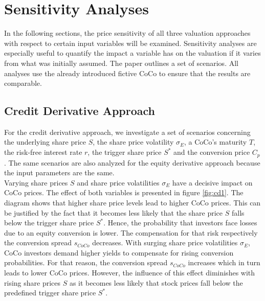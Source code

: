 \chapter{Sensitivity Analyses}
In the following sections, the price sensitivity of all three valuation approaches with respect to certain input variables will be examined. Sensitivity analyses are especially useful to quantify the impact a variable has on the valuation if it varies from what was initially assumed. The paper outlines a set of scenarios. All analyses use the already introduced fictive CoCo to ensure that the results are comparable.

\section{Credit Derivative Approach}\label{sensicredit}

For the credit derivative approach, we investigate a set of scenarios concerning the underlying share price $S$, the share price volatility $\sigma_E$, a CoCo's maturity $T$, the risk-free interest rate $r$, the trigger share price $S^*$ and the conversion price $C_p$. The same scenarios are also analyzed for the equity derivative approach because the input parameters are the same.\\

Varying share prices $S$ and share price volatilities $\sigma_E$ have a decisive impact on CoCo prices. The effect of both variables is presented in figure \ref{fig:cd1}. The diagram shows that higher share price levels lead to higher CoCo prices. This can be justified by the fact that it becomes less likely that the share price $S$ falls below the trigger share price $S^*$. Hence, the probability that investors face losses due to an equity conversion is lower. The compensation for that risk respectively the conversion spread $s_{CoCo}$ decreases. With surging share price volatilities $\sigma_E$, CoCo investors demand higher yields to compensate for rising conversion probabilities. For that reason, the conversion spread $s_{CoCo}$ increases which in turn leads to lower CoCo prices. However, the influence of this effect diminishes with rising share prices $S$ as it becomes less likely that stock prices fall below the predefined trigger share price $S^*$.\\


